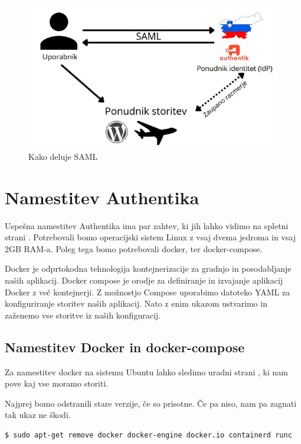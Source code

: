 \documentclass[a4paper,12pt,openright]{book}
\begin{document}
\begin{figure}[H]
\includegraphics[scale=0.7]{diploma-FRI-vzorec_11maj2021/SAML.jpg}
\caption{Kako deluje SAML}
\label{fig:grafMoj}
\end{figure}

 \section{Namestitev Authentika}

Uspešna namestitev Authentika ima par zahtev, ki jih lahko vidimo na spletni strani \cite{AuthentikLink}.
Potrebovali bomo operacijski sistem Linux z vsaj dvema jedroma in vsaj 2GB RAM-a. Poleg tega bomo potrebovali docker, ter docker-compose. 

Docker je odprtokodna tehnologija kontejnerizacije za gradnjo in posodabljanje naših aplikacij.
Docker compose je orodje za definiranje in izvajanje aplikacij Docker z več kontejnerji. Z možnostjo Compose uporabimo datoteko YAML za konfiguriranje storitev naših aplikacij. Nato z enim ukazom ustvarimo in zaženemo vse storitve iz naših konfiguracij.
\subsection{Namestitev Docker in docker-compose}

Za namestitev docker na sistemu Ubuntu lahko sledimo uradni strani \cite{DockerLink}, ki nam pove kaj vse moramo storiti. 

Najprej bomo odstranili stare verzije, če so prisotne. Če pa niso, nam pa zagnati tak ukaz ne škodi.


\begin{lstlisting}[language=bash]
 $ sudo apt-get remove docker docker-engine docker.io containerd runc
\end{lstlisting}
\end{document}
